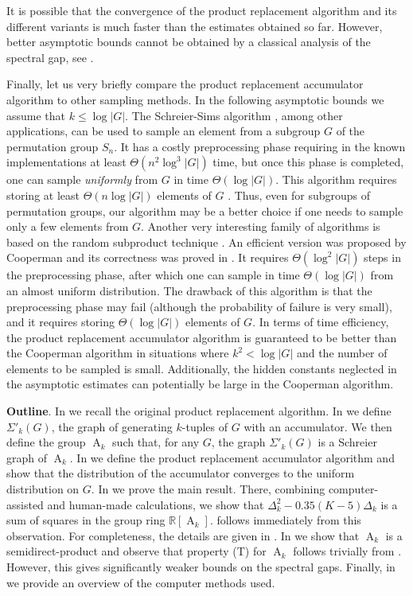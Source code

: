 \documentclass[12pt]{amsart}
\theoremstyle{definition}
\numberwithin{figure}{section}
\numberwithin{table}{section}
\numberwithin{equation}{section}
\newcommand{\A}{\operatorname{A}}
\newcommand{\BB}[1]{{\mathbb #1}}
\begin{document}
It is possible that the convergence of the product replacement algorithm and its different variants is much faster than the estimates obtained so far. However, better asymptotic bounds cannot be obtained by a classical analysis of the spectral gap, see .

Finally, let us very briefly compare the product replacement accumulator algorithm to other sampling methods. In the following asymptotic bounds we assume that $k \leq \log|G|$. The Schreier-Sims algorithm \cite{MR1112272, Seress_2003}, among other applications, can be used to sample an element from a subgroup $G$ of the permutation group $S_n$. It has a costly preprocessing phase requiring in the known implementations at least $\Theta(n^2 \log^3 |G|)$ time, but once this phase is completed, one can sample \textit{uniformly} from $G$ in time $\Theta(\log|G|)$. This algorithm requires storing at least $\Theta(n\log|G|)$ elements of $G$ \cite[Theorem 4.2.4]{Seress_2003}. Thus, even for subgroups of permutation groups, our algorithm may be a better choice if one needs to sample only a few elements from $G$. Another very interesting family of algorithms is based on the random subproduct technique \cite{10.1145/103418.103440}. An efficient version was proposed by Cooperman and its correctness was proved in \cite{Dixon2008}. It requires $\Theta(\log^2 |G|)$ steps in the preprocessing phase, after which one can sample in time $\Theta(\log|G|)$ from an almost uniform distribution. The drawback of this algorithm is that the preprocessing phase may fail (although the probability of failure is very small), and it requires storing $\Theta(\log|G|)$ elements of $G$. In terms of time efficiency, the product replacement accumulator algorithm is guaranteed to be better than the Cooperman algorithm in situations where $k^2 < \log|G|$ and the number of elements to be sampled is small. Additionally, the hidden constants neglected in the asymptotic estimates can potentially be large in the Cooperman algorithm.

\textbf{Outline}. In  we recall the original product replacement algorithm. In  we define $\Sigma'_k(G)$, the graph of generating $k$-tuples of $G$ with an accumulator. We then define the group $\A_k$ such that, for any $G$, the graph $\Sigma'_k(G)$ is a Schreier graph of $\A_k$. In  we define the product replacement accumulator algorithm and show that the distribution of the accumulator converges to the uniform distribution on $G$. In  we prove the main result. There, combining computer-assisted and human-made calculations, we show that $\Delta^2_k - 0.35(K-5)\Delta_k$ is a sum of squares in the group ring $\BB R[\A_k]$.  follows immediately from this observation. For completeness, the details are given in . In  we show that $\A_k$ is a semidirect-product and observe that property (T) for $\A_k$ follows trivially from \cite[Proposition 10]{MR4023374}. However, this gives significantly weaker bounds on the spectral gaps. Finally, in  we provide an overview of the computer methods used.
\end{document}
